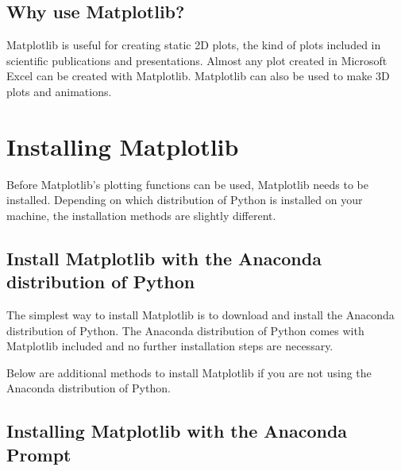 \documentclass{book}
\begin{document}
    
        \subsection{Why use Matplotlib?}\label{why-use-matplotlib}
    




    
        Matplotlib is useful for creating static 2D plots, the kind of plots
included in scientific publications and presentations. Almost any plot
created in Microsoft Excel can be created with Matplotlib. Matplotlib
can also be used to make 3D plots and animations.
    




    
        \section{Installing Matplotlib}\label{installing-matplotlib}
    




    
        Before Matplotlib's plotting functions can be used, Matplotlib needs to
be installed. Depending on which distribution of Python is installed on
your machine, the installation methods are slightly different.
    




    
        \subsection{Install Matplotlib with the Anaconda distribution of
Python}\label{install-matplotlib-with-the-anaconda-distribution-of-python}

The simplest way to install Matplotlib is to download and install the
Anaconda distribution of Python. The Anaconda distribution of Python
comes with Matplotlib included and no further installation steps are
necessary.

Below are additional methods to install Matplotlib if you are not using
the Anaconda distribution of Python.
    




    
        \subsection{Installing Matplotlib with the Anaconda
Prompt}\label{installing-matplotlib-with-the-anaconda-prompt}
\end{document}
